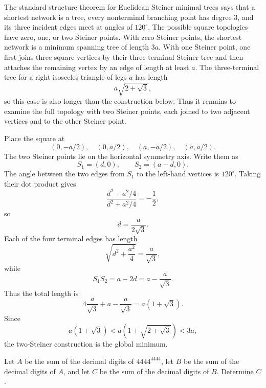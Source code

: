     \begin{solution}
        The standard structure theorem for Euclidean Steiner minimal trees says
        that a shortest network is a tree, every nonterminal branching point
        has degree $3$, and its three incident edges meet at angles of
        $120^\circ$. The possible square topologies have zero, one, or two
        Steiner points. With zero Steiner points, the shortest network is a
        minimum spanning tree of length $3a$. With one Steiner point, one first
        joins three square vertices by their three-terminal Steiner tree and
        then attaches the remaining vertex by an edge of length at least $a$.
        The three-terminal tree for a right isosceles triangle of legs $a$ has
        length
        \[
            a\sqrt{2+\sqrt3},
        \]
        so this case is also longer than the construction below. Thus it
        remains to examine the full topology with two Steiner points, each
        joined to two adjacent vertices and to the other Steiner point.

        Place the square at
        \[
            (0,-a/2),\quad(0,a/2),\quad(a,-a/2),\quad(a,a/2).
        \]
        The two Steiner points lie on the horizontal symmetry axis. Write them
        as
        \[
            S_1=(d,0),
            \qquad
            S_2=(a-d,0).
        \]
        The angle between the two edges from $S_1$ to the left-hand vertices is
        $120^\circ$. Taking their dot product gives
        \[
            \frac{d^2-a^2/4}{d^2+a^2/4}=-\frac12,
        \]
        so
        \[
            d=\frac{a}{2\sqrt3}.
        \]
        Each of the four terminal edges has length
        \[
            \sqrt{d^2+\frac{a^2}{4}}=\frac{a}{\sqrt3},
        \]
        while
        \[
            S_1S_2=a-2d=a-\frac{a}{\sqrt3}.
        \]
        Thus the total length is
        \[
            4\frac{a}{\sqrt3}
            +a-\frac{a}{\sqrt3}
            =
            \boxed{a(1+\sqrt3)}.
        \]
        Since
        \[
            a(1+\sqrt3)
            <
            a\left(1+\sqrt{2+\sqrt3}\right)
            <
            3a,
        \]
        the two-Steiner construction is the global minimum.
    \end{solution}

    \begin{expectedproblem}[1975 IMO]
        Let $A$ be the sum of the decimal digits of $4444^{4444}$, let $B$ be
        the sum of the decimal digits of $A$, and let $C$ be the sum of the
        decimal digits of $B$. Determine $C$.
    \end{expectedproblem}

